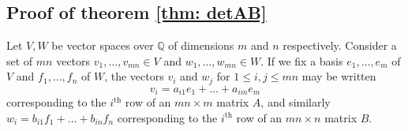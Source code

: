 \documentclass[10pt]{amsart}
\theoremstyle{definition}
\theoremstyle{remark}
\numberwithin{equation}{section}
\newcommand{\Q}{\mathbb Q}
\newcommand{\0}{\color{blue}{\mathsf{0}}}
\begin{document}
%
%
% 
%




\subsection{Proof of theorem \ref{thm: detAB}}
Let $V, W$ be vector spaces  over $\Q$  of dimensions $m$ and $n$ respectively.  Consider a set of $mn$ vectors $v_1,\ldots, v_{mn} \in V$ and  $w_1, \ldots, w_{mn} \in W$. If we fix a basis $e_1,\ldots, e_m$ of $V$ and $f_1,\ldots, f_n$ of $W$, the vectors $v_i$ and $w_j$   for $1\leq i,j\leq mn$ may be written 
\[ v_i = a_{i1} e_1 + \ldots + a_{im} e_m\] 
corresponding to the $i^\mathrm{th}$ row of an $mn \times m$ matrix $A$, 
and similarly $w_i =   b_{i1} f_1 + \ldots + b_{in} f_n$ corresponding to the $i^\mathrm{th}$ row of an $mn \times n$ matrix $B$. 
\end{document}

